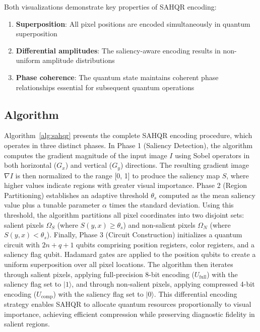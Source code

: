 \documentclass[pdflatex,sn-mathphys-num,Numbered]{sn-jnl}
\theoremstyle{thmstyleone}
\theoremstyle{thmstyletwo}
\theoremstyle{thmstylethree}
\begin{document}
Both visualizations demonstrate key properties of SAHQR encoding:
\begin{enumerate}
\item \textbf{Superposition}: All pixel positions are encoded simultaneously in quantum superposition
\item \textbf{Differential amplitudes}: The saliency-aware encoding results in non-uniform amplitude distributions
\item \textbf{Phase coherence}: The quantum state maintains coherent phase relationships essential for subsequent quantum operations
\end{enumerate}

\subsection{Algorithm}

Algorithm~\ref{alg:sahqr} presents the complete SAHQR encoding procedure, which operates in three distinct phases. In Phase 1 (Saliency Detection), the algorithm computes the gradient magnitude of the input image $I$ using Sobel operators in both horizontal ($G_x$) and vertical ($G_y$) directions. The resulting gradient image $\nabla I$ is then normalized to the range [0, 1] to produce the saliency map $S$, where higher values indicate regions with greater visual importance. Phase 2 (Region Partitioning) establishes an adaptive threshold $\theta_s$ computed as the mean saliency value plus a tunable parameter $\alpha$ times the standard deviation. Using this threshold, the algorithm partitions all pixel coordinates into two disjoint sets: salient pixels $\Omega_S$ (where $S(y,x) \geq \theta_s$) and non-salient pixels $\Omega_N$ (where $S(y,x) < \theta_s$). Finally, Phase 3 (Circuit Construction) initializes a quantum circuit with $2n + q + 1$ qubits comprising position registers, color registers, and a saliency flag qubit. Hadamard gates are applied to the position qubits to create a uniform superposition over all pixel locations. The algorithm then iterates through salient pixels, applying full-precision 8-bit encoding ($U_{\text{full}}$) with the saliency flag set to $|1\rangle$, and through non-salient pixels, applying compressed 4-bit encoding ($U_{\text{comp}}$) with the saliency flag set to $|0\rangle$. This differential encoding strategy enables SAHQR to allocate quantum resources proportionally to visual importance, achieving efficient compression while preserving diagnostic fidelity in salient regions.
\end{document}
